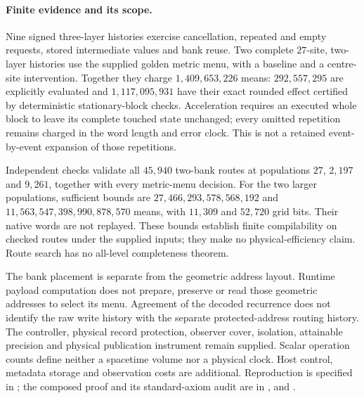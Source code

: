 \paragraph{Finite evidence and its scope.}
Nine signed three-layer histories exercise cancellation, repeated and empty
requests, stored intermediate values and bank reuse. Two complete $27$-site,
two-layer histories use the supplied golden metric menu, with a baseline
and a centre-site intervention. Together they charge $1{,}409{,}653{,}226$
means: $292{,}557{,}295$ are explicitly evaluated and $1{,}117{,}095{,}931$
have their exact rounded effect certified by deterministic stationary-block
checks. Acceleration requires an executed whole block to leave its complete
touched state unchanged; every omitted repetition remains charged in the
word length and error clock. This is not a retained event-by-event expansion
of those repetitions.

Independent checks validate all $45{,}940$ two-bank routes at populations
$27$, $2{,}197$ and $9{,}261$, together with every metric-menu decision.
For the two larger populations, sufficient bounds are
$27{,}466{,}293{,}578{,}568{,}192$ and
$11{,}563{,}547{,}398{,}990{,}878{,}570$ means, with $11{,}309$ and
$52{,}720$ grid bits. Their native words are not replayed. These bounds
establish finite compilability on checked routes under the supplied inputs;
they make no physical-efficiency claim. Route search has no all-level
completeness theorem.

The bank placement is separate from the geometric address layout. Runtime
payload computation does not prepare, preserve or read those geometric
addresses to select its menu. Agreement of the decoded recurrence does not
identify the raw write history with the separate protected-address routing
history. The controller, physical record protection,
observer cover, isolation, attainable precision and physical publication
instrument remain supplied. Scalar operation counts define neither a
spacetime volume nor a physical clock. Host control, metadata storage and
observation costs are additional. Reproduction is specified in
; the composed proof and its standard-axiom
audit are in ,
 and
.
